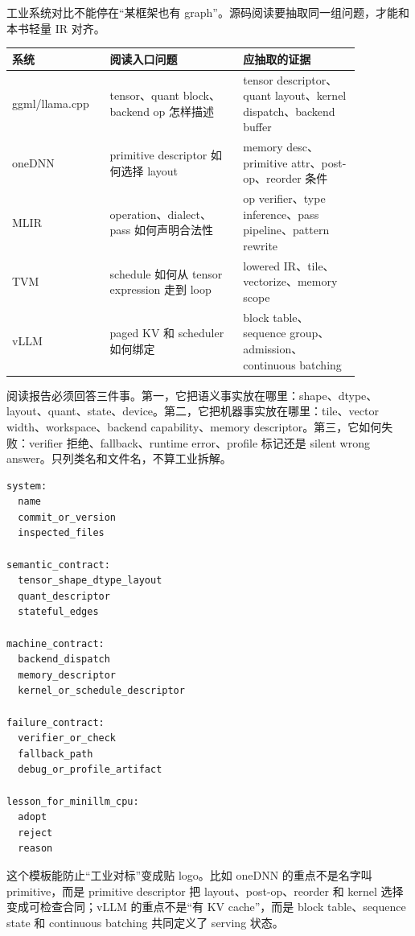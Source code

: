 工业系统对比不能停在“某框架也有 graph”。源码阅读要抽取同一组问题，才能和本书轻量 IR 对齐。

\begin{center}
\begin{tabular}{p{0.22\linewidth}p{0.34\linewidth}p{0.30\linewidth}}
\toprule
系统 & 阅读入口问题 & 应抽取的证据 \\
\midrule
ggml/llama.cpp & tensor、quant block、backend op 怎样描述 & tensor descriptor、quant layout、kernel dispatch、backend buffer \\
oneDNN & primitive descriptor 如何选择 layout & memory desc、primitive attr、post-op、reorder 条件 \\
MLIR & operation、dialect、pass 如何声明合法性 & op verifier、type inference、pass pipeline、pattern rewrite \\
TVM & schedule 如何从 tensor expression 走到 loop & lowered IR、tile、vectorize、memory scope \\
vLLM & paged KV 和 scheduler 如何绑定 & block table、sequence group、admission、continuous batching \\
\bottomrule
\end{tabular}
\end{center}

阅读报告必须回答三件事。第一，它把语义事实放在哪里：shape、dtype、layout、quant、state、device。第二，它把机器事实放在哪里：tile、vector width、workspace、backend capability、memory descriptor。第三，它如何失败：verifier 拒绝、fallback、runtime error、profile 标记还是 silent wrong answer。只列类名和文件名，不算工业拆解。

\begin{lstlisting}[numbers=none,caption={工业对照报告模板}]
system:
  name
  commit_or_version
  inspected_files

semantic_contract:
  tensor_shape_dtype_layout
  quant_descriptor
  stateful_edges

machine_contract:
  backend_dispatch
  memory_descriptor
  kernel_or_schedule_descriptor

failure_contract:
  verifier_or_check
  fallback_path
  debug_or_profile_artifact

lesson_for_minillm_cpu:
  adopt
  reject
  reason
\end{lstlisting}

这个模板能防止“工业对标”变成贴 logo。比如 oneDNN 的重点不是名字叫 primitive，而是 primitive descriptor 把 layout、post-op、reorder 和 kernel 选择变成可检查合同；vLLM 的重点不是“有 KV cache”，而是 block table、sequence state 和 continuous batching 共同定义了 serving 状态。

